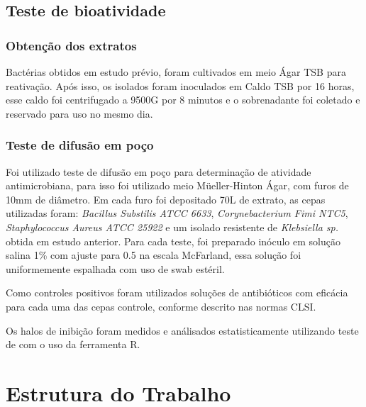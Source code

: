 \subsection{Teste de bioatividade}
\subsubsection{Obtenção dos extratos}
Bactérias obtidos em estudo prévio, foram cultivados em meio Ágar TSB para
reativação. Após isso, os isolados foram inoculados em Caldo TSB por 16 horas,
esse caldo foi centrifugado a 9500G por 8 minutos e o sobrenadante foi coletado
e reservado para uso no mesmo dia.
\subsubsection{Teste de difusão em poço}
Foi utilizado teste de difusão em poço para determinação de atividade antimicrobiana,
para isso foi utilizado meio Müeller-Hinton Ágar, com furos de 10mm de diâmetro.
Em cada furo foi depositado 70\mu L de extrato, as cepas utilizadas foram:
\textit{Bacillus Substilis ATCC 6633}, \textit{Corynebacterium Fimi NTC5}, \textit{Staphylococcus Aureus ATCC 25922}
e um isolado resistente de \textit{Klebsiella sp.} obtida em estudo anterior.
Para cada teste, foi preparado inóculo em solução salina 1\% com ajuste para 0.5
na escala McFarland, essa solução foi uniformemente espalhada com uso de swab estéril.

Como controles positivos foram utilizados soluções de antibióticos com
eficácia para cada uma das cepas controle, conforme descrito nas normas CLSI\cite{clsi2020}.

Os halos de inibição foram medidos e análisados estatisticamente utilizando teste de \rho com
o uso da ferramenta R.



\section{Estrutura do Trabalho}



